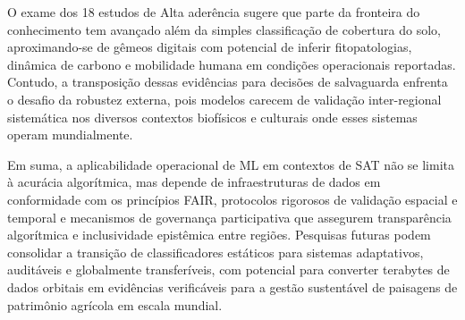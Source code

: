 O exame dos 18 estudos de Alta aderência sugere que parte da fronteira do conhecimento tem avançado além da simples classificação de cobertura do solo, aproximando-se de gêmeos digitais com potencial de inferir fitopatologias, dinâmica de carbono e mobilidade humana em condições operacionais reportadas. Contudo, a transposição dessas evidências para decisões de salvaguarda enfrenta o desafio da robustez externa, pois modelos carecem de validação inter-regional sistemática nos diversos contextos biofísicos e culturais onde esses sistemas operam mundialmente.

Em suma, a aplicabilidade operacional de ML em contextos de SAT não se limita à acurácia algorítmica, mas depende de infraestruturas de dados em conformidade com os princípios FAIR, protocolos rigorosos de validação espacial e temporal e mecanismos de governança participativa que assegurem transparência algorítmica e inclusividade epistêmica entre regiões. Pesquisas futuras podem consolidar a transição de classificadores estáticos para sistemas adaptativos, auditáveis e globalmente transferíveis, com potencial para converter terabytes de dados orbitais em evidências verificáveis para a gestão sustentável de paisagens de patrimônio agrícola em escala mundial.

